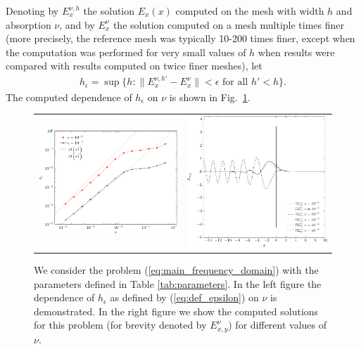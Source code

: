 Denoting by $E_{x}^{\nu,h}$ the solution $E_{x}(x)$ computed on the mesh with width $h$ and 
 absorption $\nu$, and by $E_{x}^{\nu}$ the solution computed on a mesh multiple times finer (more precisely, the reference mesh
was typically 10-200 times finer, except when the computation was performed for very small values of $h$ when results were compared with results computed on twice finer meshes), let 
\begin{align}
\label{eq:def_epsilon}
h_{\epsilon}=\sup\{h: \|E_{x}^{\nu,h'}-E_{x}^{\nu}\|<\epsilon \text{ for all } h'<h\}.
\end{align}
The computed dependence of $h_{\epsilon}$ on $\nu$ is shown in Fig.~\ref{fig:dependence}.
\begin{figure}
\begin{tabular}{cc}
\includegraphics[height=0.32\textwidth]{pics_frequency_domain/h_nu.pdf}
&
\includegraphics[height=0.32\textwidth]{pics_frequency_domain/res_sol.pdf}
\end{tabular}
\caption{We consider the problem (\ref{eq:main_frequency_domain}) with the parameters 
defined in Table \ref{tab:parameters}. In the left figure the dependence of $h_{\epsilon}$ as defined by (\ref{eq:def_epsilon}) on $\nu$ is demonstrated.  
In the right figure we show the computed solutions for this problem (for brevity denoted by $E_{x,y}^{\nu}$) for different values of $\nu$. }
\label{fig:dependence}
\end{figure}
